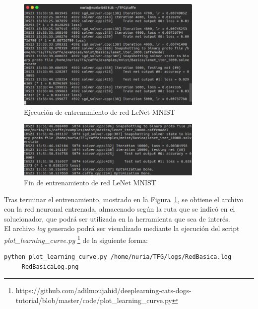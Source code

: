 	\begin{figure}[H]
		\begin{center}
			\includegraphics[width=0.8\textwidth]{figures/RedBasica5000}
			\caption{Ejecución de entrenamiento de red LeNet MNIST}
		\end{center}
	\end{figure}
	
	\begin{figure}[H]
		\begin{center}
			\includegraphics[width=0.8\textwidth]{figures/RedBasicaFin}
			\caption{Fin de entrenamiento de red LeNet MNIST}
			\label{fig.finEntrBas}
		\end{center}
	\end{figure}
	
	Tras terminar el entrenamiento, mostrado en la Figura~\ref{fig.finEntrBas}, se obtiene el archivo con la red neuronal entrenada, almacenado según la ruta que se indicó en el solucionador, que podrá ser utilizada en la herramienta que sea de interés.\\

	El archivo \textit{log} generado podrá ser visualizado mediante la ejecución del script \textit{plot\_learning\_curve.py} \footnote{https://github.com/adilmoujahid/deeplearning-cats-dogs-tutorial/blob/master/code/plot\_learning\_curve.py} de la siguiente forma:
	\vspace{10pt}
	\begin{lstlisting}[frame=single]
	python plot_learning_curve.py /home/nuria/TFG/logs/RedBasica.log 
	 RedBasicaLog.png
	\end{lstlisting}
	
